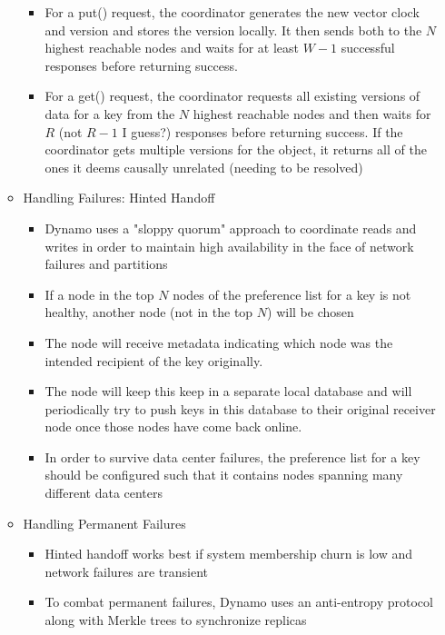 \documentclass[a4paper]{article}
\begin{document}
\begin{itemize}
\begin{itemize}
\begin{itemize}
\item For a put() request, the coordinator generates the new vector clock and version and stores the version locally. It then sends both to the $N$ highest reachable nodes and waits for at least $W-1$ successful responses before returning success.

\item For a get() request, the coordinator requests all existing versions of data for a key from the $N$ highest reachable nodes and then waits for $R$ (not $R-1$ I guess?) responses before returning success. If the coordinator gets multiple versions for the object, it returns all of the ones it deems causally unrelated (needing to be resolved)
\end{itemize}

\item Handling Failures: Hinted Handoff
\begin{itemize}
\item Dynamo uses a "sloppy quorum" approach to coordinate reads and writes in order to maintain high availability in the face of network failures and partitions

\item If a node in the top $N$ nodes of the preference list for a key is not healthy, another node (not in the top $N$) will be chosen

\item The node will receive metadata indicating which node was the intended recipient of the key originally.

\item The node will keep this keep in a separate local database and will periodically try to push keys in this database to their original receiver node once those nodes have come back online.

\item In order to survive data center failures, the preference list for a key should be configured such that it contains nodes spanning many different data centers
\end{itemize}

\item Handling Permanent Failures
\begin{itemize}
\item Hinted handoff works best if system membership churn is low and network failures are transient

\item To combat permanent failures, Dynamo uses an anti-entropy protocol along with Merkle trees to synchronize replicas


\end{itemize}
\end{itemize}
\end{itemize}
\end{document}
